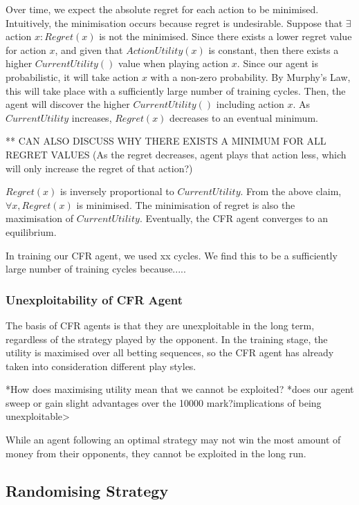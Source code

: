 \documentclass{article}
\begin{document}
Over time, we expect the absolute regret for each action to be minimised. Intuitively, the minimisation occurs because regret is undesirable. Suppose that $\exists$ action $x : Regret(x)$ is not the minimised. Since there exists a lower regret value for action $x$, and given that $ActionUtility(x)$ is constant, then there exists a higher $CurrentUtility()$ value when playing action $x$. Since our agent is probabilistic, it will take action $x$ with a non-zero probability. By Murphy's Law, this will take place with a  sufficiently large number of training cycles. Then, the agent will discover the higher $CurrentUtility()$ including action $x$. As $CurrentUtility$ increases, $Regret(x)$ decreases to an eventual minimum.

** CAN ALSO DISCUSS WHY THERE EXISTS A MINIMUM FOR ALL REGRET VALUES (As the regret decreases, agent plays that action less, which will only increase the regret of that action?)

$Regret(x)$ is inversely proportional to $CurrentUtility$. From the above claim, $\forall x, Regret(x)$ is minimised. The minimisation of regret is also the maximisation of $CurrentUtility$. Eventually, the CFR agent converges to an equilibrium.

In training our CFR agent, we used xx cycles. We find this to be a sufficiently large number of training cycles because.....

\subsubsection{Unexploitability of CFR Agent}

The basis of CFR agents is that they are unexploitable in the long term, regardless of the strategy played by the opponent. In the training stage, the utility is maximised over all betting sequences, so the CFR agent has already taken into consideration different play styles.

*How does maximising utility mean that we cannot be exploited?
*does our agent sweep or gain slight advantages over the 10000 mark?implications of being unexploitable>

While an agent following an optimal strategy may not win the most amount of money from their opponents, they cannot be exploited in the long run. 

\subsection{Randomising Strategy}
\end{document}
